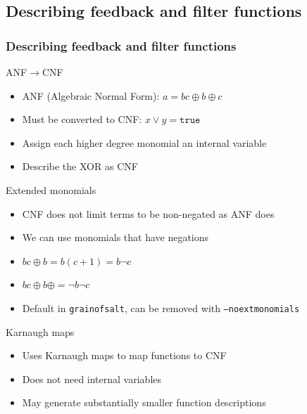 \documentclass[xcolor=usenames,xcolor=svgnames,table,slidestop,compress,mathserif]{beamer}
\begin{document}
\subsection{Describing feedback and filter functions}
\frame
{\frametitle{Describing feedback and filter functions}
\begin{beamerboxesrounded}[shadow=true]{ANF$\rightarrow$CNF}
\begin{itemize}
 \item ANF (Algebraic Normal Form): $a = bc \oplus b \oplus c$
 \item Must be converted to CNF: $x \vee y = \texttt{true}$
 \item Assign each higher degree monomial an internal variable
 \item Describe the XOR as CNF
\end{itemize}
\end{beamerboxesrounded}

\begin{beamerboxesrounded}[shadow=true]{Extended monomials}
\begin{itemize}
 \item CNF does not limit terms to be non-negated as ANF does
 \item We can use monomials that have negations
 \item $bc\oplus b = b(c+1) = b\neg c$
 \item $bc\oplus b \oplus = \neg b \neg c$
 \item Default in \texttt{grainofsalt}, can be removed with \texttt{--noextmonomials}
\end{itemize}
\end{beamerboxesrounded}

\begin{beamerboxesrounded}[shadow=true]{Karnaugh maps}
\begin{itemize}
 \item Uses Karnaugh maps to map functions to CNF
 \item Does not need internal variables
 \item May generate substantially smaller function descriptions
\end{itemize}

\end{beamerboxesrounded}

}
\end{document}

